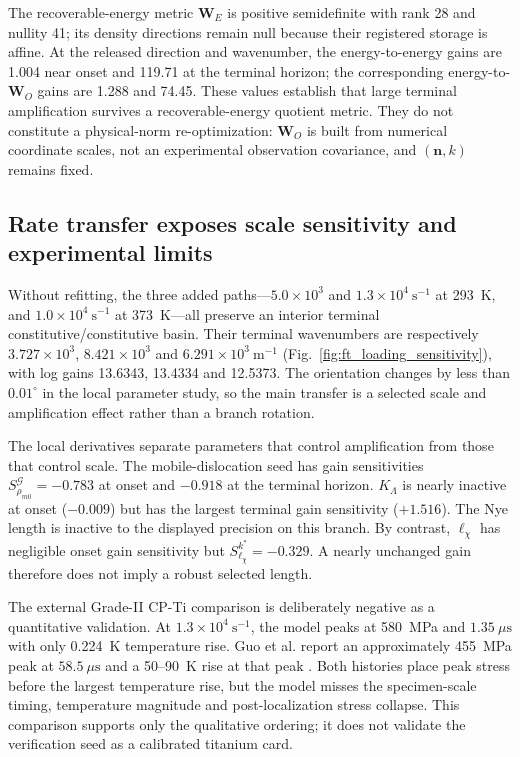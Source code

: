 The recoverable-energy metric $\boldsymbol W_E$ is positive semidefinite with
rank 28 and nullity 41; its density directions remain null because their
registered storage is affine.  At the released direction and wavenumber, the
energy-to-energy gains are 1.004 near onset and 119.71 at the terminal horizon;
the corresponding energy-to-$\boldsymbol W_O$ gains are 1.288 and 74.45.
These values establish that large terminal amplification survives a
recoverable-energy quotient metric.  They do not constitute a physical-norm
re-optimization: $\boldsymbol W_O$ is built from numerical coordinate scales,
not an experimental observation covariance, and $(\boldsymbol n,k)$ remains
fixed.

\subsection{Rate transfer exposes scale sensitivity and experimental limits}

Without refitting, the three added paths---$5.0\times10^3$ and
$1.3\times10^4~\mathrm{s^{-1}}$ at 293~K, and
$1.0\times10^4~\mathrm{s^{-1}}$ at 373~K---all preserve an interior terminal
constitutive/constitutive basin.  Their terminal wavenumbers are respectively
$3.727\times10^3$, $8.421\times10^3$ and
$6.291\times10^3~\mathrm{m^{-1}}$ (Fig.~\ref{fig:ft_loading_sensitivity}),
with log gains 13.6343, 13.4334 and 12.5373.  The orientation
changes by less than $0.01^\circ$ in the local parameter study, so the main
transfer is a selected scale and amplification effect rather than a branch
rotation.

The local derivatives separate parameters that control amplification from
those that control scale.  The mobile-dislocation seed has gain sensitivities
$S_{\rho_{m0}}^{\mathcal G}=-0.783$ at onset and $-0.918$ at the terminal
horizon.  $K_\Lambda$ is nearly inactive at onset ($-0.009$) but has the
largest terminal gain sensitivity ($+1.516$).  The Nye length is inactive to
the displayed precision on this branch.  By contrast, $\ell_\chi$ has
negligible onset gain sensitivity but
$S_{\ell_\chi}^{k^*}=-0.329$.  A nearly unchanged gain therefore does not
imply a robust selected length.

The external Grade-II CP-Ti comparison is deliberately negative as a
quantitative validation.  At $1.3\times10^4~\mathrm{s^{-1}}$, the model peaks
at 580~MPa and $1.35~\mu\mathrm s$ with only 0.224~K temperature rise.  Guo
et al. report an approximately 455~MPa peak at $58.5~\mu\mathrm s$ and a
50--90~K rise at that peak \cite{GuoEtAl2019PRL}.  Both histories place peak
stress before the largest temperature rise, but the model misses the
specimen-scale timing, temperature magnitude and post-localization stress
collapse.  This comparison supports only the qualitative ordering; it does
not validate the verification seed as a calibrated titanium card.

